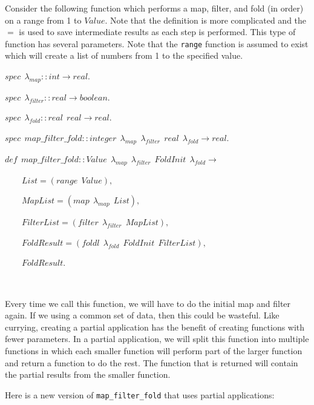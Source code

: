 \documentclass[
]{book}
\begin{document}
Consider the following function which performs a map, filter, and fold (in order) on a range from 1 to \(Value\). Note that the definition is more complicated and the \(=\) is used to save intermediate results as each step is performed. This type of function has several parameters. Note that the \texttt{range} function is assumed to exist which will create a list of numbers from 1 to the specified value.

\begin{formulabox}
\(spec ~ ~ \lambda_{map} :: int \rightarrow real.\)

\(spec ~ ~ \lambda_{filter} :: real \rightarrow boolean.\)

\(spec ~ ~ \lambda_{fold} :: real ~ ~ real \rightarrow real.\)

\(spec ~ ~ map\_\mathit{f}ilter\_\mathit{f}old :: integer ~ ~ \lambda_{map} ~ ~ \lambda_{filter} ~ ~ real ~ ~ \lambda_{fold} \rightarrow real.\)

\(de\mathit{f} ~ ~ map\_\mathit{f}ilter\_\mathit{f}old :: Value ~ ~ \lambda_{map} ~ ~ \lambda_{filter} ~ ~ FoldInit ~ ~ \lambda_{fold} \rightarrow\)

\(\quad \quad List = (range ~ ~ Value),\)

\(\quad \quad MapList = (map ~ ~ \lambda_{map} ~ ~ List),\)

\(\quad \quad FilterList = (filter ~ ~ \lambda_{filter} ~ ~ MapList),\)

\(\quad \quad FoldResult = (foldl ~ ~ \lambda_{fold} ~ ~ FoldInit ~ ~ FilterList),\)

\(\quad \quad FoldResult.\)

\end{formulabox}

\(\nonumber\)

Every time we call this function, we will have to do the initial map and filter again. If we using a common set of data, then this could be wasteful. Like currying, creating a partial application has the benefit of creating functions with fewer parameters. In a partial application, we will split this function into multiple functions in which each smaller function will perform part of the larger function and return a function to do the rest. The function that is returned will contain the partial results from the smaller function.

Here is a new version of \texttt{map\_filter\_fold} that uses partial applications:
\end{document}
